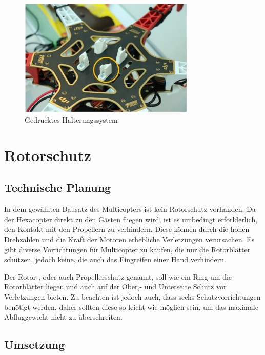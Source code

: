 			\begin{figure}[tbh]
			\begin{centering}
			\includegraphics[width = 0.75\textwidth]{Bilder/halterung_cupcake_fertig_hinweis}
			\par\end{centering}
			\caption{Gedrucktes Halterungssystem}
			\label{halterung_cupcake_fertig_hinweis}
			\end{figure}

			\newpage

\section{Rotorschutz}

	\subsection{Technische Planung}

	In dem gewählten Bausatz des Multicopters ist kein Rotorschutz vorhanden.
	Da der Hexacopter direkt zu den Gästen fliegen wird, ist es umbedingt erforlderlich, den Kontakt mit den Propellern zu verhindern.
	Diese können durch die hohen Drehzahlen und die Kraft der Motoren erhebliche Verletzungen verursachen.
	Es gibt diverse Vorrichtungen für Multicopter zu kaufen, die nur die Rotorblätter schützen, jedoch keine, die auch das Eingreifen einer Hand verhindern.

	Der Rotor-, oder auch Propellerschutz genannt, soll wie ein Ring um die Rotorblätter liegen und auch auf der Ober,- und Unterseite Schutz vor Verletzungen bieten.
	Zu beachten ist jedoch auch, dass sechs Schutzvorrichtungen benötigt werden, daher sollten diese so leicht wie möglich sein, um das maximale Abfluggewicht nicht zu überschreiten.

	\subsection{Umsetzung}

